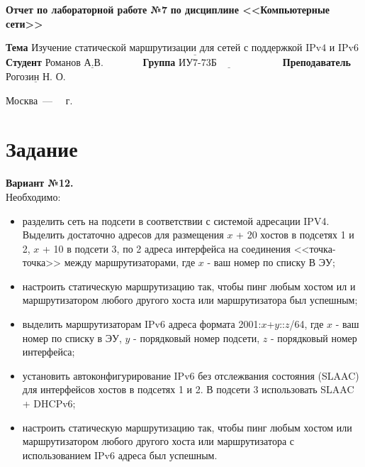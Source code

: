 \documentclass[12pt]{report}
\begin{document}
\begin{titlepage}
		\begin{center}
			\noindent\begin{minipage}{1.1\textwidth}\centering
				\Large\textbf{  Отчет по лабораторной работе №7}\newline
				\textbf{по дисциплине <<Компьютерные сети>>}\newline\newline\newline
			\end{minipage}
		\end{center}
		
		\noindent\textbf{Тема} $\underline{\text{Изучение статической маршрутизации для сетей с поддержкой IPv4 и IPv6}}$\newline\newline
		\noindent\textbf{Студент} $\underline{\text{Романов А.В.~~~~~~~~~~~}}$\newline\newline
		\noindent\textbf{Группа} $\underline{\text{ИУ7-73Б~~~~~~~~~~~~~~~~~~~}}$\newline\newline
		\noindent\textbf{Преподаватель} $\underline{\text{Рогозин Н. О.}}$\newline\newline\newline
		
		\begin{center}
			\vfill
			Москва~---~\the\year
			~г.
		\end{center}
	\end{titlepage}


\section*{Задание}

\textbf{Вариант №12.}\\

Необходимо:

\begin{itemize}	
	\item разделить сеть на подсети в соответствии с системой адресации IPV4. Выделить достаточно адресов для размещения $x$ + 20 хостов в подсетях 1 и 2, $x$ + 10 в подсети 3, по 2 адреса интерфейса на соединения <<точка-точка>> между маршрутизаторами, где $x$ - ваш номер по списку В ЭУ;
	\item настроить статическую маршрутизацию так, чтобы пинг любым хостом ил
и маршрутизатором любого другого хоста или маршрутизатора был успешным;
	\item выделить маршрутизаторам IPv6 адреса формата 2001:$x$+$y$::$z$/64, где $x$ - ваш номер по списку в ЭУ, $y$ - порядковый номер подсети, $z$ - порядковый номер интерфейса;
	\item установить автоконфигурирование IPv6 без отслежвания состояния (SLAAC) для интерфейсов хостов в подсетях 1 и 2. В подсети 3 использовать SLAAC + DHCPv6;
	\item настроить статическую маршрутизацию так, чтобы пинг любым хостом или маршрутизатором любого другого хоста или маршрутизатора с использованием IPv6 адреса был успешным.
\end{itemize}
\end{document}
